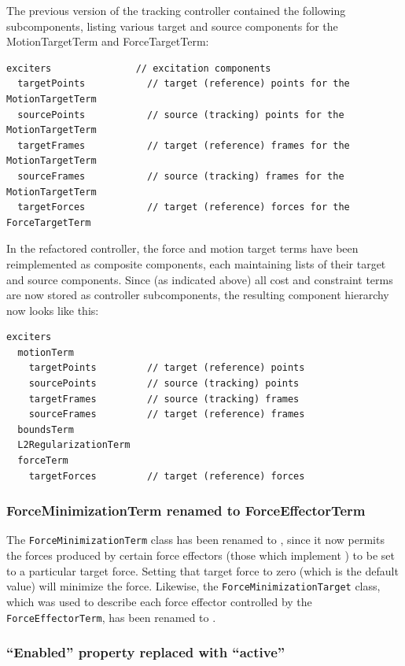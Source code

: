 \documentclass{article}
\begin{document}
The previous version of the tracking controller contained the
following subcomponents, listing various target and source components
for the MotionTargetTerm and ForceTargetTerm:
%
\begin{lstlisting}[]
  exciters               // excitation components
  targetPoints           // target (reference) points for the MotionTargetTerm
  sourcePoints           // source (tracking) points for the MotionTargetTerm
  targetFrames           // target (reference) frames for the MotionTargetTerm
  sourceFrames           // source (tracking) frames for the MotionTargetTerm
  targetForces           // target (reference) forces for the ForceTargetTerm
\end{lstlisting}
%
In the refactored controller, the force and motion target terms have
been reimplemented as composite components, each maintaining lists of
their target and source components. Since (as indicated above) all
cost and constraint terms are now stored as controller subcomponents,
the resulting component hierarchy now looks like this:
%
\begin{lstlisting}[]
  exciters
  motionTerm
    targetPoints         // target (reference) points
    sourcePoints         // source (tracking) points 
    targetFrames         // source (tracking) frames 
    sourceFrames         // target (reference) frames
  boundsTerm
  L2RegularizationTerm
  forceTerm
    targetForces         // target (reference) forces
\end{lstlisting}
%

\subsubsection*{ForceMinimizationTerm renamed to ForceEffectorTerm}

The {\tt ForceMinimizationTerm} class has been renamed to
, since it now
permits the forces produced by certain force effectors (those which
implement ) to
be set to a particular target force. Setting that target force to zero
(which is the default value) will minimize the force. Likewise, the
{\tt ForceMinimizationTarget} class, which was used to describe each
force effector controlled by the {\tt ForceEffectorTerm}, has been
renamed to .

\subsubsection*{``Enabled'' property replaced with ``active''}
\end{document}
